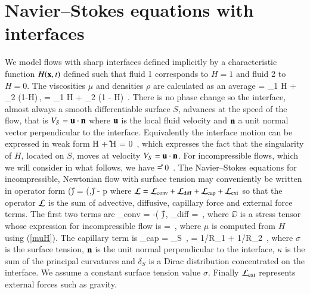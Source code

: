 
\section{Navier--Stokes equations with interfaces} 
\label{nse}

We model flows with sharp interfaces defined implicitly by a characteristic function $H({\bf x},t)$
defined such that fluid 1 corresponds to $H=1$ and fluid 2 to $H=0$. The viscosities $\mu$
and densities $\rho$ are calculated as an average
\be
\mu = \mu_1 H + \mu_2 (1-H)\,, \qquad \rho = \rho_1 H + \rho_2 (1 - H) \,. 
\label{muH}
\nd
There is no phase change so the interface, 
almost always a smooth differentiable surface $S$, advances at the speed of the 
flow, that is $V_S={\bf u}\cdot {\bf n}$ where ${\bf u}$ is the local fluid velocity 
and ${\bf n}$ a unit normal vector perpendicular to the interface. Equivalently 
the interface motion can be expressed in weak form
\be
\dert H + \U \cdot \grad H = 0 \,, 
\label{interfadv}
\nd
which expresses the fact that the singularity of $H$, located on $S$, moves at velocity $V_S={\bf u}\cdot {\bf n}$. 
For incompressible flows, which we will consider in what follows, we have
\be
\nabla \cdot \U = 0 \,.
\label{divu}
\nd
The Navier--Stokes equations for incompressible, Newtonian flow with surface tension may 
conveniently be written in operator form
\be
 \dert (\rho \U) = \LLL(\rho,\U) - \grad p \label{nse1}
\nd
where 
$
{\cal L} =  {\cal L}_{\rm conv} + {\cal L}_{\rm diff} +   {\cal L}_{\rm cap} + {\cal L}_{\rm ext}
$
so that the operator ${\cal L}$ is the sum of advective, diffusive, capillary force and
external force terms. The first two terms are 
\be
\LLL_{\rm conv} = -\grad \cdot ( \rho \U  \U )\,, \qquad \LLL_{\rm diff} =  \grad \cdot \DD \,,
\nd
where $\DD$ is a stress tensor whose expression for incompressible flow is
\be
\DD = \mu {} \,,
\nd
where $\mu$ is computed from $H$ using (\ref{muH}). 
The capillary term is
\be
\LLL_{\rm cap} =  {\sigma \kappa \delta_S \N} \,,  \qquad \kappa = 1/R_1 + 1/R_2 \,,
\nd
where $\sigma$ is the surface tension, ${\bf n}$ is the unit normal perpendicular to the interface,
$\kappa$ is the sum of the principal curvatures and $\delta_S$ is 
a Dirac distribution concentrated on the interface.  
We assume a constant surface tension value $\sigma$. Finally
${\cal L}_{\rm ext}$ represents external forces such as gravity. 

